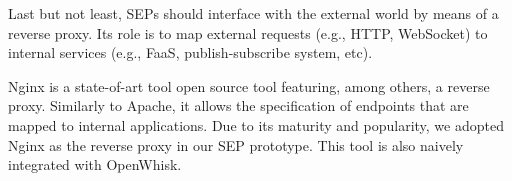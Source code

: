 Last but not least, SEPs should interface with the external world by means of a reverse proxy. Its role is to map external requests (e.g., HTTP, WebSocket) to internal services (e.g., FaaS, publish-subscribe system, etc). 

Nginx is a state-of-art tool open source tool featuring, among others, a reverse proxy. Similarly to Apache, it allows the specification of endpoints that are mapped to internal applications. Due to its maturity and popularity, we adopted Nginx as the reverse proxy in our SEP prototype. This tool is also naively integrated with OpenWhisk.


